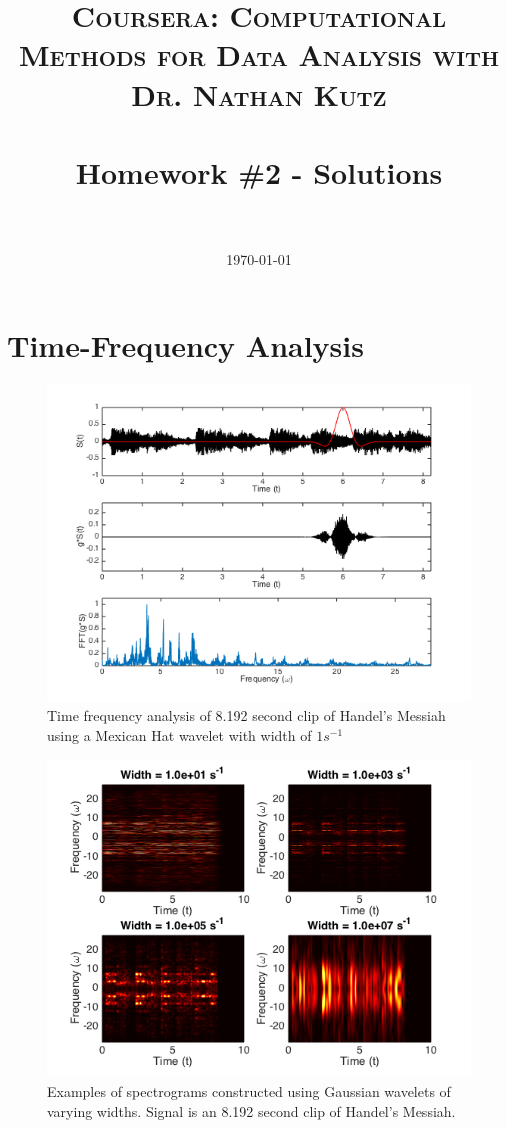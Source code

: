 \documentclass[paper=a4, fontsize=11pt]{scrartcl} %
\title{	
\normalfont \normalsize 
\textsc{Coursera: Computational Methods for Data Analysis with Dr. Nathan Kutz} \\ [25pt] %
\horrule{0.5pt} \\[0.4cm] %
\huge Homework \#2 - Solutions \\ %
\horrule{2pt} \\[0.5cm] %
}
\author{ } %
\date{\normalsize\today} %
\numberwithin{equation}{section} %
\numberwithin{figure}{section} %
\numberwithin{table}{section} %
\begin{document}
\maketitle %


\section{Time-Frequency Analysis}

\begin{figure}
	\centering
	\includegraphics[scale = 0.8]{time_frequency.png}
	\caption{Time frequency analysis of 8.192 second clip of Handel's Messiah using a Mexican Hat wavelet with width of $1 s^{-1}$}
\end{figure}
\begin{figure}
	\centering
	\includegraphics[scale = 0.8]{spectrogram_gauss.png}
	\caption{Examples of spectrograms constructed using Gaussian wavelets of varying widths. Signal is an 8.192 second clip of Handel's Messiah.}
\end{figure}
\end{document}

